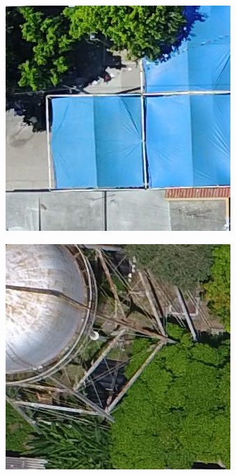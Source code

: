 \begin{figure}[!h]
  \centering
    \begin{subfigure}{.24\textwidth}
        \includegraphics[width=\textwidth]{images/nondamaged1.jpg}
    \end{subfigure}
    \begin{subfigure}{.24\textwidth}
        \includegraphics[width=\textwidth]{images/nondamaged2.jpg}

\end{subfigure}
\end{figure}
